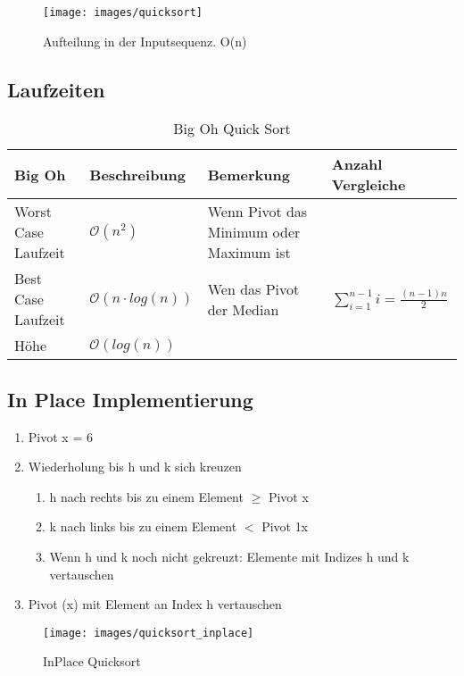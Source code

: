 \begin{figure}[h!]
	\centering
	\begin{minipage}[t]{0.6\textwidth}
		\centering
		\texttt{[image: images/quicksort]}
		\caption{Aufteilung in der Inputsequenz. O(n)}
		\label{fig:quicksortalg}
	\end{minipage}
\end{figure}
\clearpage
\subsection{Laufzeiten}
\begin{table}[h]
	\centering
	\begin{tabu} to \linewidth {l l X X}
		\toprule
		Big Oh & Beschreibung & Bemerkung & Anzahl Vergleiche \\
		\midrule
		Worst Case Laufzeit & $\mathcal{O}(n^2)$ & Wenn Pivot das Minimum oder Maximum ist & \\
		Best Case Laufzeit &  $\mathcal{O}(n \cdot log(n))$ & Wen das Pivot der Median & $\sum_{i=1}^{n-1} i = \frac{(n-1)n}{2}$\\
		Höhe & $\mathcal{O}(log(n))$ & \\
		\bottomrule
	\end{tabu}
	\caption{Big Oh Quick Sort}
\end{table}

\subsection{In Place Implementierung}
\begin{enumerate}
	\item Pivot x = 6
	\item Wiederholung bis h und k sich kreuzen
	\begin{enumerate}
		\item h nach rechts bis zu einem Element $\geq$ Pivot x
		\item k nach links bis zu einem Element $<$ Pivot 1x
		\item Wenn h und k noch nicht gekreuzt: Elemente mit Indizes h und k vertauschen
	\end{enumerate}
	\item Pivot (x) mit Element an Index h vertauschen
\end{enumerate}
\begin{figure}[h]
\centering
\texttt{[image: images/quicksort\_inplace]}
\caption{InPlace Quicksort}
\label{fig:quicksortinplace}
\end{figure}


